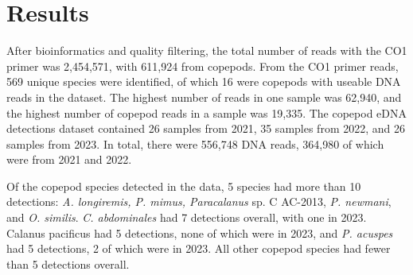 \documentclass[12pt,twoside]{reedthesis}
\begin{document}
	\chapter{Results}
	
	
	After bioinformatics and quality filtering, the total number of reads with the CO1 primer was 2,454,571, with 611,924 from copepods. From the CO1 primer reads, 569 unique species were identified, of which 16 were copepods with useable DNA reads in the dataset. The highest number of reads in one sample was 62,940, and the highest number of copepod reads in a sample was 19,335. The copepod eDNA detections dataset contained 26 samples from 2021, 35 samples from 2022, and 26 samples from 2023. In total, there were 556,748 DNA reads, 364,980 of which were from 2021 and 2022. 
	
	Of the copepod species detected in the data, 5 species had more than 10 detections: \textit{A. longiremis, P. mimus, Paracalanus} sp. C AC-2013, \textit{P. newmani}, and \textit{O. similis}. \textit{C. abdominales} had 7 detections overall, with one in 2023. Calanus pacificus had 5 detections, none of which were in 2023, and \textit{P. acuspes} had 5 detections, 2 of which were in 2023. All other copepod species had fewer than 5 detections overall.
	
	
	
	
\end{document}
